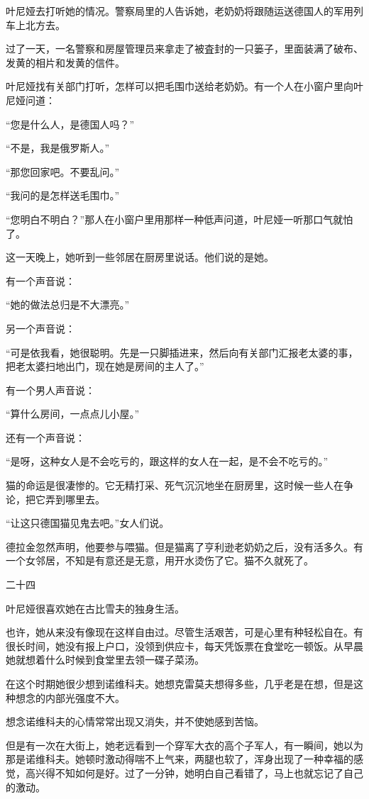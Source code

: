 叶尼娅去打听她的情况。警察局里的人告诉她，老奶奶将跟随运送德国人的军用列车上北方去。

过了一天，一名警察和房屋管理员来拿走了被査封的一只篓子，里面装满了破布、发黄的相片和发黄的信件。

叶尼娅找有关部门打听，怎样可以把毛围巾送给老奶奶。有一个人在小窗户里向叶尼娅问道：

“您是什么人，是德国人吗？”

“不是，我是俄罗斯人。”

“那您回家吧。不要乱问。”

“我问的是怎样送毛围巾。”

“您明白不明白？”那人在小窗户里用那样一种低声问道，叶尼娅一听那口气就怕了。

这一天晚上，她听到一些邻居在厨房里说话。他们说的是她。

有一个声音说：

“她的做法总归是不大漂亮。”

另一个声音说：

“可是依我看，她很聪明。先是一只脚插进来，然后向有关部门汇报老太婆的事，把老太婆扫地出门，现在她是房间的主人了。”

有一个男人声音说：

“算什么房间，一点点儿小屋。”

还有一个声音说：

“是呀，这种女人是不会吃亏的，跟这样的女人在一起，是不会不吃亏的。”

猫的命运是很凄惨的。它无精打采、死气沉沉地坐在厨房里，这时候一些人在争论，把它弄到哪里去。

“让这只德国猫见鬼去吧。”女人们说。

德拉金忽然声明，他要参与喂猫。但是猫离了亨利逊老奶奶之后，没有活多久。有一个女邻居，不知是有意还是无意，用开水烫伤了它。猫不久就死了。

二十四

叶尼娅很喜欢她在古比雪夫的独身生活。

也许，她从来没有像现在这样自由过。尽管生活艰苦，可是心里有种轻松自在。有很长时间，她没有报上户口，没领到供应卡，每天凭饭票在食堂吃一顿饭。从早晨她就想着什么时候到食堂里去领一碟子菜汤。

在这个时期她很少想到诺维科夫。她想克雷莫夫想得多些，几乎老是在想，但是这种想念的内部光强度不大。

想念诺维科夫的心情常常出现又消失，并不使她感到苦恼。

但是有一次在大街上，她老远看到一个穿军大衣的高个子军人，有一瞬间，她以为那是诺维科夫。她顿时激动得喘不上气来，两腿也软了，浑身出现了一种幸福的感觉，高兴得不知如何是好。过了一分钟，她明白自己看错了，马上也就忘记了自己的激动。

